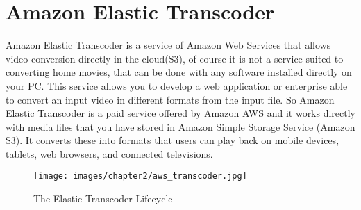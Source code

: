 \section{Amazon Elastic Transcoder}
\label{sec:Amazon Elastic Transcoder}

Amazon Elastic Transcoder is a service of Amazon Web Services that allows video conversion directly in the cloud(S3), of course it is not a service suited to converting home movies, that can be done with any software installed directly on your PC. 
This service allows you to develop a web application or enterprise able to convert an input video in different formats from the input file.
So Amazon Elastic Transcoder is a paid service offered by Amazon AWS and it works directly with media files that you have stored in Amazon Simple Storage Service (Amazon S3). It converts these into formats that users can play back on mobile devices, tablets, web browsers, and connected televisions.

\begin{figure}[htb] %
 \centering
 \texttt{[image: images/chapter2/aws\_transcoder.jpg]}\hfill
 \caption[The Elastic Transcoder Lifecycle]{The Elastic Transcoder Lifecycle}
 \label{fig:fourV}
\end{figure}

